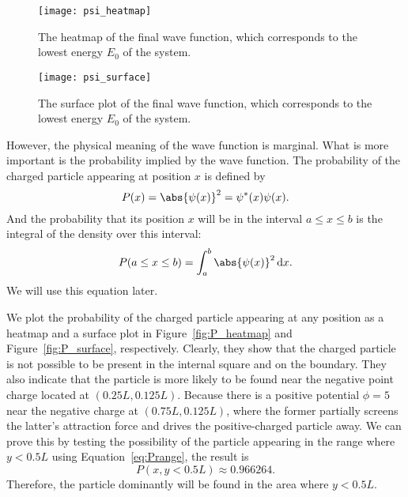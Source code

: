 \begin{figure}[!hbt]
    \centering
    \texttt{[image: psi\_heatmap]}
    \caption{The heatmap of the final wave function, which corresponds to the
        lowest energy $E_0$ of the system.}
    \label{fig:psi_heatmap}
\end{figure}

\begin{figure}[!hbt]
    \centering
    \texttt{[image: psi\_surface]}
    \caption{The surface plot of the final wave function, which corresponds to the
        lowest energy $E_0$ of the system.}
    \label{fig:psi_surface}
\end{figure}

However, the physical meaning of the wave function is marginal.
What is more important is the probability implied by the wave function.
The probability of the charged particle appearing at position $x$ is defined by
%
\begin{equation}
    P(x) = \abs{\psi(x)}^2 = \psi^\ast(x) \psi(x).
\end{equation}
%
And the probability that its position $x$ will be in the interval $a \leq x \leq b$ is the
integral of the density over this interval:
%
\begin{equation}\label{eq:Prange}
    P(a \leq x \leq b) = \int_{a}^{b} \abs{\psi(x)}^2 \, \mathrm{d}x.
\end{equation}
%
We will use this equation later.

We plot the probability of the charged particle appearing at any position
as a heatmap and a surface plot in Figure~\ref{fig:P_heatmap} and Figure~\ref{fig:P_surface},
respectively.
Clearly, they show that the charged particle is not possible to be present in the
internal square and on the boundary.
They also indicate that the particle is more likely to be found near the negative
point charge located at \((0.25L, 0.125L)\). Because there is a positive potential
$\phi = 5$ near the negative charge at \((0.75L, 0.125L)\), where the former partially
screens the latter's attraction force and drives the positive-charged particle away.
We can prove this by testing the possibility of the particle appearing in the
range where $y < 0.5L$ using Equation~\eqref{eq:Prange}, the result is
%
\begin{equation}
    P(x, y < 0.5L) \approx 0.966264.
\end{equation}
%
Therefore, the particle dominantly will be found in the area where $y < 0.5L$.

